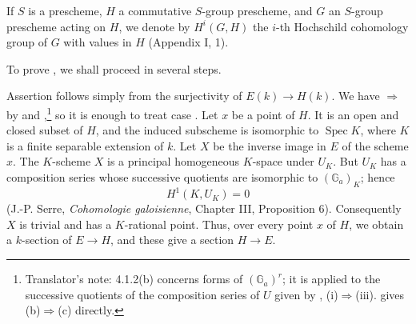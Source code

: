 
If \(S\) is a prescheme, \(H\) a commutative \(S\)-group
prescheme, and \(G\) an \(S\)-group prescheme acting on \(H\), we
denote by \(H^i(G,H)\) the \(i\)-th Hochschild cohomology group of \(G\)
with values in \(H\) (Appendix I, 1).

To prove , we shall proceed in several steps.



Assertion  follows simply from the surjectivity of
\(E(k)\to H(k)\).  We have \(\Rightarrow\) by 
and ,\footnote{Translator's note: 4.1.2(b)
concerns forms of \((\mathbb G_a)^r\); it is applied to the
successive quotients of the composition series of \(U\) given by
, (i)\(\Rightarrow\)(iii).  gives
(b)\(\Rightarrow\)(c) directly.} so it is enough to treat case .  Let \(x\) be a
point of \(H\).  It is an open and closed subset of \(H\), and
the induced subscheme is isomorphic to \(\operatorname{Spec}K\),
where \(K\) is a finite separable extension of \(k\).  Let \(X\)
be the inverse image in \(E\) of the scheme \(x\).  The
\(K\)-scheme \(X\) is a principal homogeneous \(K\)-space under
\(U_K\).  But \(U_K\) has a composition series whose successive
quotients are isomorphic to \((\mathbb G_a)_K\); hence
\[
  H^1(K,U_K)=0
\]
(J.-P. Serre, \emph{Cohomologie galoisienne}, Chapter III,
Proposition 6).  Consequently \(X\) is trivial and has a
\(K\)-rational point.  Thus, over every point \(x\) of \(H\), we
obtain a \(k\)-section of \(E\to H\), and these give a section
\(H\to E\).

